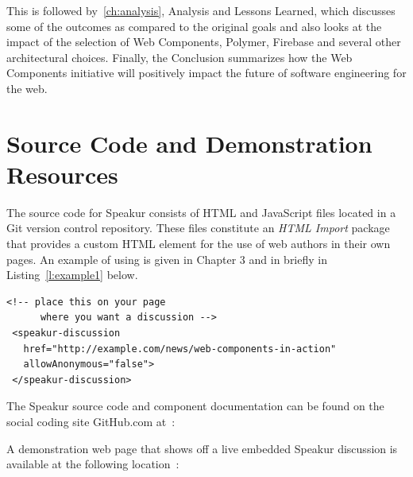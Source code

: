 This is followed by~\cref{ch:analysis}, Analysis and Lessons Learned, which discusses some of the outcomes 
as compared to the original goals and also looks at the impact of the selection of Web Components, 
Polymer, Firebase and several other architectural choices. 
Finally, the Conclusion summarizes how the Web Components initiative will positively impact the future of software engineering for the web. 

\section{Source Code and Demonstration Resources}

The source code for Speakur consists of HTML and JavaScript files located in a Git version control repository. 
These files constitute an \textit{HTML Import} package that provides a
\textbf{}
custom HTML element for the use of web authors in their own pages.
An example of using  is given in Chapter 3 and in briefly in Listing~\ref{l:example1} below.

\begin{lstlisting}[language=HTML5,caption={Speakur custom HTML element},label=l:example1]
 <!-- place this on your page
      where you want a discussion -->
 <speakur-discussion
   href="http://example.com/news/web-components-in-action"
   allowAnonymous="false">
 </speakur-discussion>
\end{lstlisting}

The Speakur source code and component documentation can be found on the social coding site GitHub.com at~\cite{landers2015-b}:


A demonstration web page that shows off a live embedded Speakur discussion is available at the following location~\cite{landers2015-c}:

